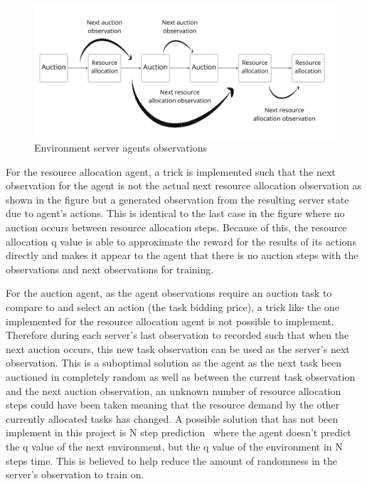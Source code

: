 \begin{figure}
    \centering
    \includegraphics[width=14cm]{figures/env_server_agents_observations.pdf}
    \caption{Environment server agents observations}
    \label{fig:environment-observations}
\end{figure}

For the resource allocation agent, a trick is implemented such that the next observation for the agent is not the
actual next resource allocation observation as shown in the figure but a generated observation from the resulting
server state due to agent's actions. This is identical to the last case in the figure where no auction occurs between
resource allocation steps. Because of this, the resource allocation q value is able to approximate the reward for the
results of its actions directly and makes it appear to the agent that there is no auction steps with the observations
and next observations for training.

For the auction agent, as the agent observations require an auction task to compare to and select an action (the task
bidding price), a trick like the one implemented for the resource allocation agent is not possible to implement.
Therefore during each server's last observation to recorded such that when the next auction occurs, this new task
observation can be used as the server's next observation. This is a suboptimal solution as the agent as the next task
been auctioned in completely random as well as between the current task observation and the next auction observation,
an unknown number of resource allocation steps could have been taken meaning that the resource demand by the other
currently allocated tasks has changed. A possible solution that has not been implement in this project is N step
prediction~\citep{multi-step-dqn} where the agent doesn't predict the q value of the next environment, but the q value
of the environment in N steps time. This is believed to help reduce the amount of randomness in the server's
observation to train on.

